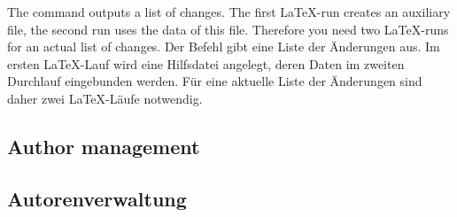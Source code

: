 \subsubsection{}
\DescribeMacro{\listofchanges}
\ifENGLISH
	The command  outputs a list of changes.
	The first \LaTeX-run creates an auxiliary file, the second run uses the data of this file.
	Therefore you need two \LaTeX-runs for an actual list of changes.
\fi
	\ifGERMAN
		Der Befehl  gibt eine Liste der Änderungen aus.
		Im ersten \LaTeX-Lauf wird eine Hilfsdatei angelegt, deren Daten im zweiten Durchlauf eingebunden werden.
		Für eine aktuelle Liste der Änderungen sind daher zwei \LaTeX-Läufe notwendig.
	\fi
\begin{einspiel}
	\>
\end{einspiel}

\ifENGLISH
	\subsection{Author management}
\fi
	\ifGERMAN
		\subsection{Autorenverwaltung}
	\fi


